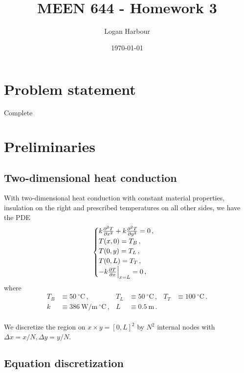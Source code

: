 \documentclass{article}
\newcommand{\pageTitle}{MEEN 644 - Homework 3}
\newcommand{\pageAuthor}{Logan Harbour}
\begin{document}
\title{\LARGE \textbf{\pageTitle} \vspace{-0.3cm}}
\author{\large \pageAuthor}
\date{\vspace{-0.6cm} \large \today \vspace{-0.4cm}}

\maketitle

\section*{Problem statement}

Complete

\section*{Preliminaries}

\subsection*{Two-dimensional heat conduction}

With two-dimensional heat conduction with constant material properties, insulation on the right and prescribed temperatures on all other sides, we have the PDE
\begin{equation}
	\begin{cases}
		k \pdv{^2T}{x^2} + k \pdv{^2T}{y^2} = 0\,,\\
		T(x, 0) = T_B\,,\\
		T(0, y) = T_L\,,\\
		T(0, L) = T_T\,,\\
		-k \pdv{T}{x} \Big|_{x = L} = 0\,,
	\end{cases}
\end{equation}
where
\begin{align*}
	T_B & \equiv 50~^\circ\text{C}\,, & T_L & \equiv 50~^\circ\text{C}\,, & T_T & \equiv 100~^\circ\text{C}\,.\\ 
	k & \equiv 386~\text{W/m}~^\circ\text{C}\,, & L & \equiv 0.5~\text{m}\,.\\
\end{align*}

We discretize the region on $x \times y = [0, L]^2$ by $N^2$ internal nodes with $\Delta x = x / N, \Delta y = y / N$.

\subsection*{Equation discretization}
\end{document}
